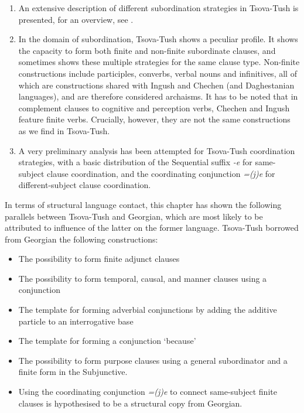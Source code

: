 \begin{enumerate}
	\item An extensive description of different subordination strategies in Tsova-Tush is presented, for an overview, see .
	
	\item In the domain of subordination, Tsova-Tush shows a peculiar profile. It shows the capacity to form both finite and non-finite subordinate clauses, and sometimes shows these multiple strategies for the same clause type. Non-finite constructions include participles, converbs, verbal nouns and infinitives, all of which are constructions shared with Ingush and Chechen (and Daghestanian languages), and are therefore considered archaisms. It has to be noted that in  complement clauses to cognitive and perception verbs, Chechen and Ingush feature finite verbs. Crucially, however, they are not the same constructions as we find in Tsova-Tush. 
	
	\item A very preliminary analysis has been attempted for Tsova-Tush coordination strategies, with a basic distribution of the Sequential suffix \textit{-e} for same-subject clause coordination, and the coordinating conjunction \textit{=(j)e} for different-subject clause coordination. 
	
\end{enumerate}


In terms of structural language contact, this chapter has shown the following parallels between Tsova-Tush and Georgian, which are most likely to be attributed to influence of the latter on the former language. Tsova-Tush borrowed from Georgian the following constructions:

\begin{itemize}
	\item The possibility to form finite adjunct clauses
	\item The possibility to form temporal, causal, and manner clauses using a conjunction 
	\item The template for forming adverbial conjunctions by adding the additive particle to an interrogative base
	\item The template for forming a conjunction `because'
	\item The possibility to form purpose clauses using a general subordinator and a finite form in the Subjunctive.
	\item  Using the coordinating conjunction \textit{=(j)e} to connect same-subject finite clauses is hypothesised to be a structural copy from Georgian.
\end{itemize}






